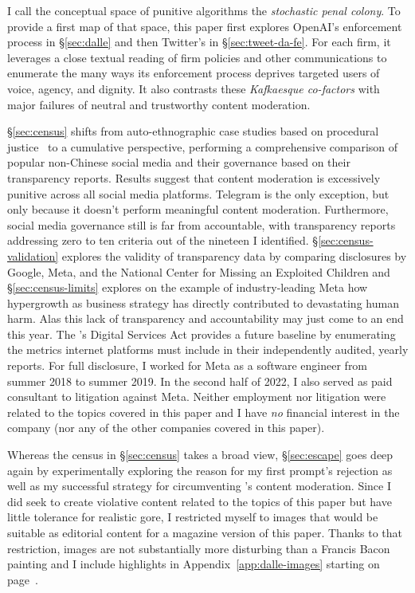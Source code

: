 I call the conceptual space of punitive algorithms the \emph{stochastic penal
colony}. To provide a first map of that space, this paper first explores
OpenAI's enforcement process in \S\ref{sec:dalle} and then Twitter's in
\S\ref{sec:tweet-da-fe}. For each firm, it leverages a close textual reading of
firm policies and other communications to enumerate the many ways its
enforcement process deprives targeted users of voice, agency, and dignity. It
also contrasts these \emph{Kafkaesque co-factors} with major failures of neutral
and trustworthy content moderation.

\S\ref{sec:census} shifts from auto-ethnographic case studies based on
procedural justice~\cite{Tyler2003,Tyler2006,Tyler2007} to a cumulative
perspective, performing a comprehensive comparison of popular non-Chinese social
media and their governance based on their transparency reports. Results suggest
that content moderation is excessively punitive across all social media
platforms. Telegram is the only exception, but only because it doesn't perform
meaningful content moderation. Furthermore, social media governance still is far
from accountable, with transparency reports addressing zero to ten criteria out
of the nineteen I identified. \S\ref{sec:census-validation} explores the
validity of transparency data by comparing disclosures by Google, Meta, and the
National Center for Missing an Exploited Children and \S\ref{sec:census-limits}
explores on the example of industry-leading Meta how hypergrowth as business
strategy has directly contributed to devastating human harm. Alas this lack of
transparency and accountability may just come to an end this year. The \EU's
Digital Services Act provides a future baseline by enumerating the metrics
internet platforms must include in their independently audited, yearly reports.
For full disclosure, I worked for Meta as a software engineer from summer 2018
to summer 2019. In the second half of 2022, I also served as paid consultant to
litigation against Meta. Neither employment nor litigation were related to the
topics covered in this paper and I have \emph{no} financial interest in the
company (nor any of the other companies covered in this paper).

Whereas the census in \S\ref{sec:census} takes a broad view, \S\ref{sec:escape}
goes deep again by experimentally exploring the reason for my first prompt's
rejection as well as my successful strategy for circumventing \DALLE's content
moderation. Since I did seek to create violative content related to the topics
of this paper but have little tolerance for realistic gore, I restricted myself
to images that would be suitable as editorial content for a magazine version of
this paper. Thanks to that restriction, images are not substantially more
disturbing than a Francis Bacon painting and I include highlights in
Appendix~\ref{app:dalle-images} starting on page~\pageref{app:dalle-images}.

